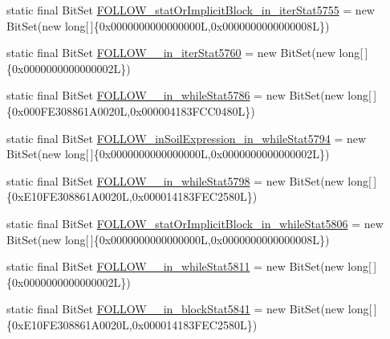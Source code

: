 \begin{DoxyCompactItemize}
\item 
static final Bit\-Set \hyperlink{classorg_1_1tzi_1_1use_1_1parser_1_1testsuite_1_1_test_suite_parser_a655ae6c5772238345f48c782d9762bc8}{F\-O\-L\-L\-O\-W\-\_\-stat\-Or\-Implicit\-Block\-\_\-in\-\_\-iter\-Stat5755} = new Bit\-Set(new long\mbox{[}$\,$\mbox{]}\{0x0000000000000000\-L,0x0000000000000008\-L\})
\item 
static final Bit\-Set \hyperlink{classorg_1_1tzi_1_1use_1_1parser_1_1testsuite_1_1_test_suite_parser_ad4faedbc312bd392dd823b0482fdc4e6}{F\-O\-L\-L\-O\-W\-\_\-\_\-in\-\_\-iter\-Stat5760} = new Bit\-Set(new long\mbox{[}$\,$\mbox{]}\{0x0000000000000002\-L\})
\item 
static final Bit\-Set \hyperlink{classorg_1_1tzi_1_1use_1_1parser_1_1testsuite_1_1_test_suite_parser_ad259964786550f47a13034e60510fb82}{F\-O\-L\-L\-O\-W\-\_\-\_\-in\-\_\-while\-Stat5786} = new Bit\-Set(new long\mbox{[}$\,$\mbox{]}\{0x000\-F\-E308861\-A0020\-L,0x000004183\-F\-C\-C0480\-L\})
\item 
static final Bit\-Set \hyperlink{classorg_1_1tzi_1_1use_1_1parser_1_1testsuite_1_1_test_suite_parser_a8170cc1d4cd70fcfdb2c67db0656f036}{F\-O\-L\-L\-O\-W\-\_\-in\-Soil\-Expression\-\_\-in\-\_\-while\-Stat5794} = new Bit\-Set(new long\mbox{[}$\,$\mbox{]}\{0x0000000000000000\-L,0x0000000000000002\-L\})
\item 
static final Bit\-Set \hyperlink{classorg_1_1tzi_1_1use_1_1parser_1_1testsuite_1_1_test_suite_parser_adeee7092b6394bba42af7749ec951044}{F\-O\-L\-L\-O\-W\-\_\-\_\-in\-\_\-while\-Stat5798} = new Bit\-Set(new long\mbox{[}$\,$\mbox{]}\{0x\-E10\-F\-E308861\-A0020\-L,0x000014183\-F\-E\-C2580\-L\})
\item 
static final Bit\-Set \hyperlink{classorg_1_1tzi_1_1use_1_1parser_1_1testsuite_1_1_test_suite_parser_af91f163e1515b7439185cd558cb461da}{F\-O\-L\-L\-O\-W\-\_\-stat\-Or\-Implicit\-Block\-\_\-in\-\_\-while\-Stat5806} = new Bit\-Set(new long\mbox{[}$\,$\mbox{]}\{0x0000000000000000\-L,0x0000000000000008\-L\})
\item 
static final Bit\-Set \hyperlink{classorg_1_1tzi_1_1use_1_1parser_1_1testsuite_1_1_test_suite_parser_a5e4db8546e757b7989bd3d673fc8651a}{F\-O\-L\-L\-O\-W\-\_\-\_\-in\-\_\-while\-Stat5811} = new Bit\-Set(new long\mbox{[}$\,$\mbox{]}\{0x0000000000000002\-L\})
\item 
static final Bit\-Set \hyperlink{classorg_1_1tzi_1_1use_1_1parser_1_1testsuite_1_1_test_suite_parser_a7e3f7d71afeb7a452e4c58962a8f2e54}{F\-O\-L\-L\-O\-W\-\_\-\_\-in\-\_\-block\-Stat5841} = new Bit\-Set(new long\mbox{[}$\,$\mbox{]}\{0x\-E10\-F\-E308861\-A0020\-L,0x000014183\-F\-E\-C2580\-L\})

\end{DoxyCompactItemize}
